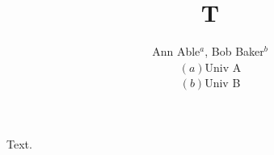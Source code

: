 \documentclass{article}
\begin{document}
\title{T}
\author{Ann Able$^{a}$, Bob Baker$^{b}$\\ $(a)$Univ A\\ $(b)$Univ B}
\maketitle
Text.
\end{document}
